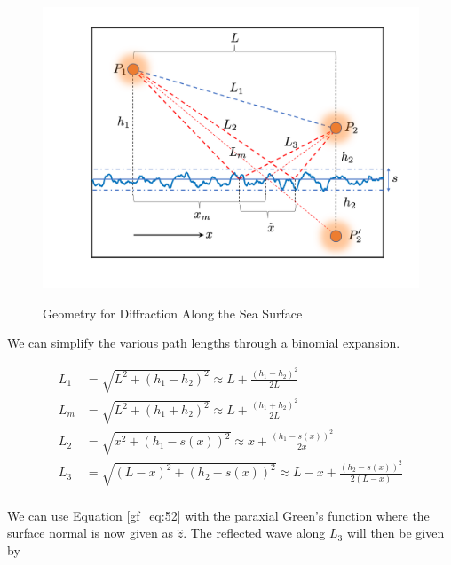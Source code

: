 \begin{figure}[ht]
  \centering
\includegraphics[width=5in]{../media/analysis/multipath_layout.png}
  
  \renewcommand{\baselinestretch}{1} \small\normalsize
  \begin{quote}
    \caption[Geometry for Diffraction Along the Sea Surface]{Geometry for Diffraction Along the Sea Surface\label{gf_fig:15}}
  \end{quote}
\end{figure}
\renewcommand{\baselinestretch}{2} \small\normalsize

\noindent We can simplify the various path lengths through a binomial expansion. 

\begin{equation}
\begin{aligned}
L_1 & = \sqrt{L^2 + (h_1-h_2)^2}  \approx L + \frac{(h_1 - h_2)^2}{2L}\\
L_m & = \sqrt{L^2 + (h_1+h_2)^2}  \approx L + \frac{(h_1 + h_2)^2}{2L}\\
L_2 &= \sqrt{x^2 + \left( h_1 - s(x)\right)^2}  \approx x + \frac{(h_1-s(x))^2}{2x}\\
L_3 & = \sqrt{\left(L - x\right)^2 + \left( h_2 - s(x)\right)^2}  \approx L-x + \frac{(h_2 - s(x))^2}{2\left(L-x\right)}\\
\end{aligned}
\label{gf_eq:59}
\end{equation}
\renewcommand{\baselinestretch}{2} \small\normalsize

We can use Equation \ref{gf_eq:52} with the paraxial Green's function where the surface normal is now given as $\hat{z}$. The reflected wave along $L_3$ will then be given by

